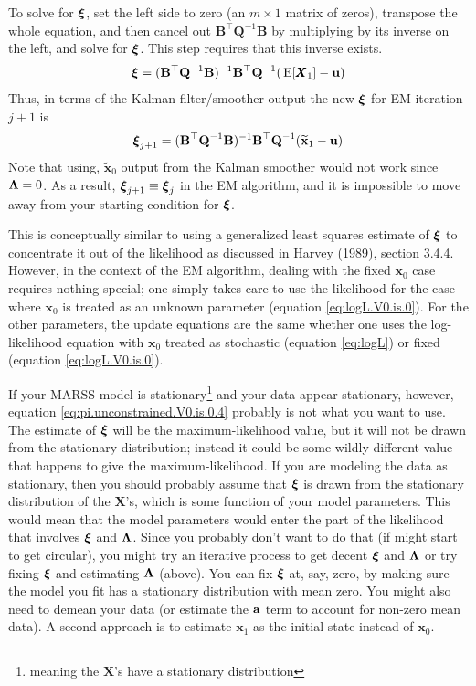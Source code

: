 \documentclass[]{article}
\def\xixi{\mbox{\boldmath $\xi$}}
\def\LAM{\mbox{\boldmath $\Lambda$}}
\def\BB{\mbox{$\mathbf B$}}	\def\bb{\mbox{$\mathbf b$}}
\def\QQ{\mbox{$\mathbf Q$}}	 \def\qq{\mbox{$\mathbf q$}}
\def\XX{\mbox{$\pmb{X}$}}	\def\xx{\mbox{$\pmb{x}$}}
\def\E{\,\textup{\textrm{E}}}
\begin{document}
To solve for $\xixi$, set the left side to zero (an $m \times 1$ matrix of zeros), transpose the whole equation, and then cancel out $\BB^\top\QQ^{-1}\BB$ by multiplying by its inverse on the left, and solve for $\xixi$.  This step requires that this inverse exists.
\begin{equation}\label{eq:pi.unconstrained.V0.is.0.4}
\begin{split}
\xixi = (\BB^\top\QQ^{-1}\BB)^{-1}\BB^\top\QQ^{-1}(\E[\XX_1]  - \uu) 
\end{split}
\end{equation}
Thus, in terms of the Kalman filter/smoother output the new $\xixi$ for EM iteration $j+1$ is
\begin{equation}\label{eq:pi.unconstrained.V0.is.0.5}
\begin{split}
\xixi_{j+1} = (\BB^\top\QQ^{-1}\BB)^{-1}\BB^\top\QQ^{-1}(\widetilde{\mbox{$\mathbf x$}}_1  - \uu) 
\end{split}
\end{equation}
Note that using, $\widetilde{\mbox{$\mathbf x$}}_0$ output from the Kalman smoother would not work since $\LAM=0$.  As a result, $\xixi_{j+1} \equiv \xixi_j$ in the EM algorithm, and it is impossible to move away from your starting condition for $\xixi$.

This is conceptually similar to using a generalized least squares estimate of $\xixi$ to concentrate it out of the likelihood as discussed in Harvey (1989), section 3.4.4.  However, in the context of the EM algorithm, dealing with the fixed $\xx_0$ case requires nothing special; one simply takes care to use the likelihood for the case where $\xx_0$ is treated as an unknown parameter (equation \ref{eq:logL.V0.is.0}).  For the other parameters, the update equations are the same whether one uses the log-likelihood equation with $\xx_0$ treated as stochastic (equation \ref{eq:logL}) or fixed (equation \ref{eq:logL.V0.is.0}).

If your MARSS model is stationary\footnote{meaning the $\XX$'s have a stationary distribution} and your data appear stationary, however, equation \ref{eq:pi.unconstrained.V0.is.0.4} probably is not what you want to use.  The estimate of $\xixi$ will be the maximum-likelihood value, but it will not be drawn from the stationary distribution; instead it could be some wildly different value that happens to give the maximum-likelihood.  If you are modeling the data as stationary, then you should probably assume that $\xixi$ is drawn from the stationary distribution of the $\XX$'s, which is some function of your model parameters.  This would mean that the model parameters would enter the part of the likelihood that involves $\xixi$ and $\LAM$. Since you probably don't want to do that (if might start to get circular), you might try an iterative process to get decent $\xixi$ and $\LAM$ or try fixing $\xixi$ and estimating $\LAM$ (above).  You can fix $\xixi$ at, say, zero, by making sure the model you fit has a stationary distribution with mean zero.  You might also need to demean your data (or estimate the $\aa$ term to account for non-zero mean data).  A second approach is to estimate $\xx_1$ as the initial state instead of $\xx_0$.
\end{document}
